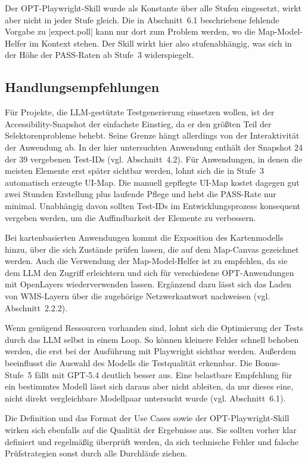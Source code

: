Der \ac{OPT}-Playwright-Skill wurde als Konstante über alle Stufen eingesetzt, wirkt aber nicht in jeder Stufe gleich. Die in Abschnitt~6.1 beschriebene fehlende Vorgabe zu \code|expect.poll| kann nur dort zum Problem werden, wo die Map-Model-Helfer im Kontext stehen. Der Skill wirkt hier also stufenabhängig, was sich in der Höhe der PASS-Raten ab Stufe~3 widerspiegelt.

\subsection{Handlungsempfehlungen}

Für Projekte, die \ac{LLM}-gestützte Testgenerierung einsetzen wollen, ist der Accessibility-Snapshot der einfachste Einstieg, da er den größten Teil der Selektorenprobleme behebt. Seine Grenze hängt allerdings von der Interaktivität der Anwendung ab. In der hier untersuchten Anwendung enthält der Snapshot 24 der 39 vergebenen Test-IDs (vgl. Abschnitt~4.2). Für Anwendungen, in denen die meisten Elemente erst später sichtbar werden, lohnt sich die in Stufe~3 automatisch erzeugte \ac{UI}-Map. Die manuell gepflegte \ac{UI}-Map kostet dagegen gut zwei Stunden Erstellung plus laufende Pflege und hebt die PASS-Rate nur minimal. Unabhängig davon sollten Test-IDs im Entwicklungsprozess konsequent vergeben werden, um die Auffindbarkeit der Elemente zu verbessern.

Bei kartenbasierten Anwendungen kommt die Exposition des Kartenmodells hinzu, über die sich Zustände prüfen lassen, die auf dem Map-Canvas gezeichnet werden. Auch die Verwendung der Map-Model-Helfer ist zu empfehlen, da sie dem \ac{LLM} den Zugriff erleichtern und sich für verschiedene \ac{OPT}-Anwendungen mit OpenLayers wiederverwenden lassen. Ergänzend dazu lässt sich das Laden von \ac{WMS}-Layern über die zugehörige Netzwerkantwort nachweisen (vgl. Abschnitt~2.2.2).

Wenn genügend Ressourcen vorhanden sind, lohnt sich die Optimierung der Tests durch das \ac{LLM} selbst in einem Loop. So können kleinere Fehler schnell behoben werden, die erst bei der Ausführung mit Playwright sichtbar werden. Außerdem beeinflusst die Auswahl des Modells die Testqualität erkennbar. Die Bonus-Stufe~5 fällt mit GPT-5.4 deutlich besser aus. Eine belastbare Empfehlung für ein bestimmtes Modell lässt sich daraus aber nicht ableiten, da nur dieses eine, nicht direkt vergleichbare Modellpaar untersucht wurde (vgl. Abschnitt~6.1).

Die Definition und das Format der Use Cases sowie der OPT-Playwright-Skill wirken sich ebenfalls auf die Qualität der Ergebnisse aus. Sie sollten vorher klar definiert und regelmäßig überprüft werden, da sich technische Fehler und falsche Prüfstrategien sonst durch alle Durchläufe ziehen.